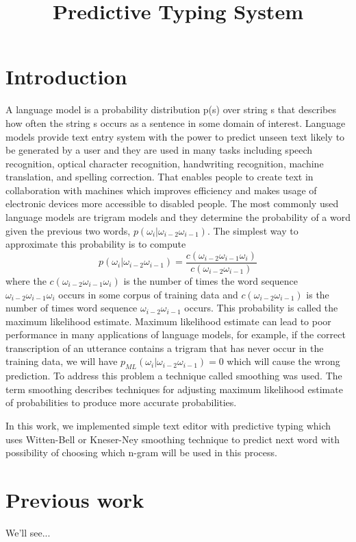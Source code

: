 \documentclass[10pt, a4paper]{article}
\title{Predictive Typing System}
\begin{document}
\maketitleabstract

\section{Introduction}
A language model is a probability distribution p(s) over string s that describes how often the string s occurs as a sentence in some domain of interest. 
Language models provide text entry system with the power to predict unseen text likely to be generated by a user and they are used in many tasks including speech recognition, optical character recognition, handwriting recognition, machine translation, and spelling correction.  That enables people to create text in collaboration with machines which improves efficiency and makes usage of electronic devices more accessible to disabled people. The most commonly used language models are trigram models and they determine the probability of a word given the previous two words, $ p(\omega_i|\omega_{i-2}\omega_{i-1}) $. The simplest way to approximate this probability is to compute 
\begin{equation}
p(\omega_i|\omega_{i-2}\omega_{i-1}) = \frac{c(\omega_{i-2}\omega_{i-1}\omega_i)}{c(\omega_{i-2}\omega_{i-1})}
\end{equation}
where the $ c(\omega_{i-2}\omega_{i-1}\omega_i) $ is the number of times the word sequence $ \omega_{i-2}\omega_{i-1}\omega_i $ occurs in some corpus of training data and $ c(\omega_{i-2}\omega_{i-1}) $ is the number of times word sequence $ \omega_{i-2}\omega_{i-1} $ occurs. This probability is called the maximum likelihood estimate. Maximum likelihood estimate can lead to poor performance in many applications of language models, for example, if the correct transcription of an utterance contains a trigram that has never occur in the training data, we will have $ p_{ML}(\omega_i|\omega_{i-2}\omega_{i-1})=0 $ which will cause the wrong prediction. To address this problem a technique called smoothing was used. The term smoothing describes techniques for adjusting maximum likelihood estimate of probabilities to produce more accurate probabilities. 

In this work, we implemented simple text editor with predictive typing which uses Witten-Bell or Kneser-Ney smoothing technique to predict next word with possibility of choosing which n-gram will be used in this process.  


\section{Previous work}
We'll see...
\end{document}
